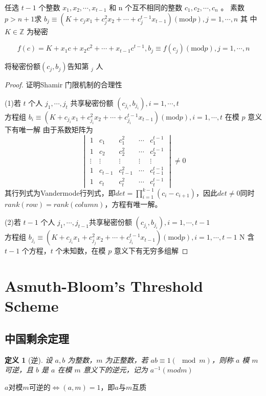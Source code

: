 \documentclass[10t, a4paper, oneside]{ctexbook}
\newtheorem{definition}[theorem]{定义}
\begin{document}
任选 $t-1$ 个整数 $x_1,x_2,\cdots,x_{t-1}$ 和 n 个互不相同的整数 $c_1,c_2,\cdots,c_n$ 。
素数 $p>n+1$求 $b_j\equiv(K+c_jx_1+c_j^2x_2+\cdots+c_j^{t-1}x_{t-1})\left({\mathrm{mod}}p\right),j=1,\cdots,n$ 其
中 $K\in\mathbb{Z}$ 为秘密

$$f(c)=K+x_1c+x_2c^2+\cdots+x_{t-1}c^{t-1},b_j\equiv f(c_j)({\mathrm{mod}}p),j=1,\cdots,n$$

将秘密份额$\left(c_j,b_j\right)$告知第 $_j$ 人

\begin{proof}{证明Shamir 门限机制的合理性}
 
    (1)若 $t$ 个人 $j_1,\cdots,j_t$ 共享秘密份额 $(c_{j_i},b_{j_i}),i=1,\cdots,t$\\
    方程组 $b_i\equiv\left(K+c_{j_i}x_1+c_{j_i}^2x_2+\cdots+c_{j_i}^{t-1}x_{t-1}\right)\left({\mathrm{mod}}p\right),i=1,\cdots,t$ 在模 $p$ 意义下有唯一解
    由于系数矩阵为
    $$\begin{vmatrix}1&c_1&c_1^2&\cdots&c_1^{t-1}\\1&c_2&c_2^2&\cdots&c_2^{t-1}\\\vdots&\vdots&\vdots&\vdots&\vdots\\1&c_{t-1}&c_{t-1}^2&\cdots&c_{t-1}^{t-1}\\1&c_t&c_t^2&\cdots&c_t^{t-1}\end{vmatrix}\neq 0$$
    其行列式为Vandermode行列式，即$det = \prod_{i = 1}^{k-1} (c_i-c_{i+1})$，因此$det \neq 0$同时$rank(row) = rank(column)$，方程有唯一解。

    (2)若 $t-1$ 个人 $j_1,\cdots,j_{t-1}$共享秘密份额 $(c_{j_i},b_{j_i}),i=1,\cdots,t-1$\\
    方程组 $b_{j_i}\equiv(K+c_{j_i}x_1+c_{j_j}^2x_2+\cdots+c_{j_i}^{t-1}x_{t-1})({\mathrm{mod}}p),i=1,\cdots,t-1$ 
    N
    含 $t-1$ 个方程，$t$ 个未知数，在模 $p$ 意义下有无穷多组解
    
\end{proof}
\section{Asmuth-Bloom's Threshold Scheme}
\subsection{中国剩余定理}
\begin{definition}[逆]
    设 $a,b$ 为整数，$m$ 为正整数，若 $ab\equiv 1(\mod m)$，则称 $a$ 模 $m$ 可逆，且 $b$ 是 $a$ 在模 $m$ 意义下的逆元，记为 $a^{-1}(mod m)$    
\end{definition}
$a$对模$m$可逆的$\Leftrightarrow (a,m) = 1$，即$a$与$m$互质
\end{document}
